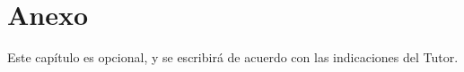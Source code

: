 \chapter*{Anexo}
Este capítulo es opcional, y se escribirá de acuerdo con las indicaciones del Tutor. 









 